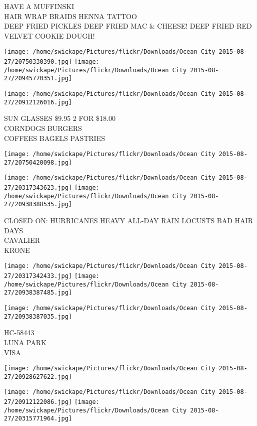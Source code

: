 \documentclass[10pt,letterpaper]{article}
\begin{document}
HAVE A MUFFINSKI\\
HAIR WRAP BRAIDS HENNA TATTOO\\
DEEP FRIED PICKLES  DEEP FRIED MAC \& CHEESE!  DEEP FRIED RED VELVET COOKIE DOUGH!\\
\pagebreak

\texttt{[image: /home/swickape/Pictures/flickr/Downloads/Ocean City 2015-08-27/20750330390.jpg]}
\texttt{[image: /home/swickape/Pictures/flickr/Downloads/Ocean City 2015-08-27/20945770351.jpg]}

\texttt{[image: /home/swickape/Pictures/flickr/Downloads/Ocean City 2015-08-27/20912126016.jpg]}

SUN GLASSES \$9.95 2 FOR \$18.00\\
CORNDOGS BURGERS\\
COFFEES BAGELS PASTRIES\\
\pagebreak

\texttt{[image: /home/swickape/Pictures/flickr/Downloads/Ocean City 2015-08-27/20750420098.jpg]}

\vspace{0.25in}
\texttt{[image: /home/swickape/Pictures/flickr/Downloads/Ocean City 2015-08-27/20317343623.jpg]}
\texttt{[image: /home/swickape/Pictures/flickr/Downloads/Ocean City 2015-08-27/20938388535.jpg]}

CLOSED ON: HURRICANES HEAVY ALL{-}DAY RAIN LOCUSTS BAD HAIR DAYS\\
CAVALIER\\
KRONE\\
\pagebreak

\texttt{[image: /home/swickape/Pictures/flickr/Downloads/Ocean City 2015-08-27/20317342433.jpg]}
\texttt{[image: /home/swickape/Pictures/flickr/Downloads/Ocean City 2015-08-27/20938387485.jpg]}

\texttt{[image: /home/swickape/Pictures/flickr/Downloads/Ocean City 2015-08-27/20938387035.jpg]}

HC{-}58443\\
LUNA PARK\\
VISA\\
\pagebreak

\texttt{[image: /home/swickape/Pictures/flickr/Downloads/Ocean City 2015-08-27/20928627622.jpg]}

\vspace{0.25in}
\texttt{[image: /home/swickape/Pictures/flickr/Downloads/Ocean City 2015-08-27/20912122086.jpg]}
\texttt{[image: /home/swickape/Pictures/flickr/Downloads/Ocean City 2015-08-27/20315771964.jpg]}
\end{document}
